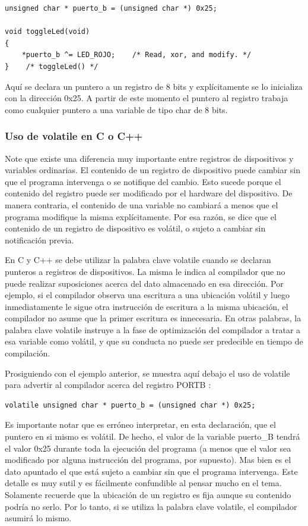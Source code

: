 \documentclass[12pt]{article}
\begin{document}
\begin{verbatim}
unsigned char * puerto_b = (unsigned char *) 0x25;

void toggleLed(void)
{
    *puerto_b ^= LED_ROJO;    /* Read, xor, and modify. */
}    /* toggleLed() */
\end{verbatim}

Aquí se declara un puntero a un registro de 8 bits y explícitamente se lo
inicializa con  la dirección 0x25. A partir de este momento el puntero al 
registro
trabaja como cualquier puntero a una variable de tipo char de 8 bits.


\subsubsection *{Uso de volatile en C o C++}

Note que existe una diferencia muy importante entre 
registros de dispositivos y variables ordinarias. El contenido de un registro
de dispositivo puede cambiar sin que el programa intervenga o se notifique
del cambio. Esto sucede porque el contenido del registro puede ser modificado
por el hardware del dispositivo. De manera contraria, el contenido de una
variable no cambiará a menos que el programa modifique la misma explícitamente.
Por esa razón, se dice que el contenido de un registro de dispositivo
es volátil, o sujeto a cambiar sin notificación previa.

En C y C++ se debe utilizar la palabra clave volatile cuando se 
declaran punteros a registros de dispositivos.
La misma le indica al compilador que no puede realizar suposiciones acerca
del dato almacenado en esa dirección. Por ejemplo, si el compilador
observa una escritura a una ubicación volátil y luego inmediatamente 
le sigue otra instrucción de escritura a la misma ubicación, el compilador 
no asume  que la primer escritura es innecesaria. En otras palabras, la
palabra clave volatile instruye a la fase de optimización del compilador 
a tratar a esa variable como volátil, y que su conducta no puede ser
predecible en tiempo de compilación.

Prosiguiendo con el ejemplo anterior, se muestra aquí debajo el uso 
de volatile para advertir al compilador acerca del registro PORTB :

\begin{verbatim}
volatile unsigned char * puerto_b = (unsigned char *) 0x25;
\end{verbatim}

Es importante notar que es erróneo interpretar, en esta declaración,
que el puntero en si mismo es volátil. De hecho, el valor de la
variable puerto\_B tendrá el valor 0x25 durante toda la ejecución del programa
(a menos que el valor sea modificado por alguna instrucción del programa, por
supuesto). Mas bien es el dato apuntado el que está sujeto a cambiar
sin que el programa intervenga. Este detalle es muy sutil y es fácilmente
confundible al pensar mucho en el tema. Solamente recuerde que la ubicación
de un registro es fija aunque su contenido podría no serlo. Por lo tanto, si se
utiliza la palabra clave volatile, el compilador asumirá lo mismo.
\end{document}
